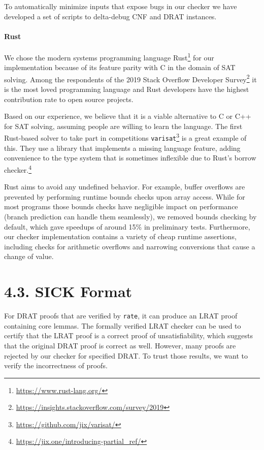 \documentclass[
]{report}
\begin{document}
To automatically minimize inputs that expose bugs in our checker we have
developed a set of scripts to delta-debug CNF and DRAT instances.

\paragraph{Rust}

We chose the modern systems programming language Rust\footnote{\url{https://www.rust-lang.org/}}
for our implementation because of its feature parity with C in the
domain of SAT solving. Among the respondents of the 2019 Stack Overflow
Developer Survey\footnote{\url{https://insights.stackoverflow.com/survey/2019}}
it is the most loved programming language and Rust developers have the
highest contribution rate to open source projects.

Based on our experience, we believe that it is a viable alternative to C
or C++ for SAT solving, assuming people are willing to learn the
language. The first Rust-based solver to take part in competitions
\texttt{varisat}\footnote{\url{https://github.com/jix/varisat/}} is a
great example of this. They use a library that implements a missing
language feature, adding convenience to the type system that is
sometimes inflexible due to Rust's borrow checker.\footnote{\url{https://jix.one/introducing-partial_ref/}}

Rust aims to avoid any undefined behavior. For example, buffer overflows
are prevented by performing runtime bounds checks upon array access.
While for most programs those bounds checks have negligible impact on
performance (branch prediction can handle them seamlessly), we removed
bounds checking by default, which gave speedups of around 15\% in
preliminary tests. Furthermore, our checker implementation contains a
variety of cheap runtime assertions, including checks for arithmetic
overflows and narrowing conversions that cause a change of value.

\hypertarget{sick-format}{%
\section{4.3. SICK Format}\label{sick-format}}

For DRAT proofs that are verified by \texttt{rate}, it can produce an
LRAT proof containing core lemmas. The formally verified LRAT checker
can be used to certify that the LRAT proof is a correct proof of
unsatisfiability, which suggests that the original DRAT proof is correct
as well. However, many proofs are rejected by our checker for specified
DRAT. To trust those results, we want to verify the incorrectness of
proofs.
\end{document}
